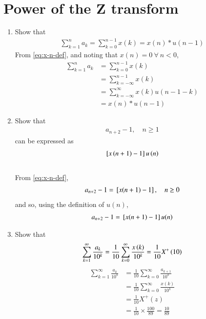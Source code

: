 \documentclass[journal,12pt,twocolumn]{IEEEtran}
\renewcommand\thesection{\arabic{section}}
\begin{document}
\section{Power of the Z transform}
\begin{enumerate}[label=\thesection.\arabic*,ref=\thesection.\theenumi]
\item Show that 
\begin{align}
	\sum_{k=1}^{n}a_k = 
	\sum_{k=0}^{n-1}x(k) = x(n)*u(n-1)
\end{align}
\solution From \eqref{eq:x-n-def}, and noting that $x(n) = 0\ \forall\ n < 0$,
\begin{align}
    \sum_{k=1}^{n}a_k &= \sum_{k=0}^{n-1}x(k) \\
                      &= \sum_{k = -\infty}^{n - 1}x(k) \\
                      &= \sum_{k = -\infty}^{\infty}x(k)u(n - 1 - k) \\
                      &= x(n)*u(n - 1)
\end{align}
\item Show that 
\begin{align}
a_{n+2}-1, \quad n \ge 1
\end{align}
can be expressed as 
\begin{align}
	{}\left[x\left(n+1\right)-1\right]u\left(n\right)
\end{align}
\\
\solution From \eqref{eq:x-n-def},
\begin{align}
    a_{n+2} - 1 = {}\left[x(n + 1) - 1\right], \quad n \ge 0
\end{align}
and so, using the definition of $u(n)$,
\begin{align}
    a_{n+2} - 1 = {}\left[x(n + 1) - 1\right]u(n)
\end{align}
\item Show that 
\begin{align}
	\sum_{k=1}^{\infty}\frac{a_k}{10^k}= 
	\frac{1}{10}\sum_{k=0}^{\infty}\frac{x\left(k\right)}{10^k} =\frac{1}{10}X^{+}\left({10}\right)
\end{align}
\label{pr:1-2}
\solution 
\begin{align}
    \sum_{k=1}^{\infty}\frac{a_k}{10^k} &= \frac{1}{10}\sum_{k = 0}^{\infty}\frac{a_{k+1}}{10^k} \\
                                        &= \frac{1}{10}\sum_{k = 0}^{\infty}\frac{x(k)}{10^k} \\
                                        &= \frac{1}{10}X^+(z) \\
                                        &= \frac{1}{10}\times\frac{100}{89} = \frac{10}{89}

\end{align}
\end{enumerate}
\end{document}
